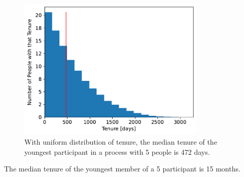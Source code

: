 \begin{figure}[H]
    \centering
    \includegraphics[width=0.8\textwidth]{images/tenure_uniform_distribution_with_max_tenure10_and_5_participants_median472.pdf}
    \caption{With uniform distribution of tenure,
the median tenure of the youngest participant
 in a process with 5 people is 472 days.}
    \label{fig:tenure-uniform-5-participants}
\end{figure}

The median tenure of the youngest member of a 5 participant is 15 months. 
